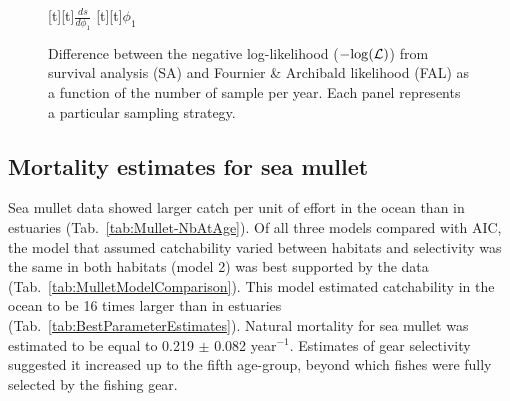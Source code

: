 \documentclass[12pt]{article}
\begin{document}
\begin{figure}
[t][t]{{\protect\large $\displaystyle\frac{ds}{d\phi_1}$}}
[t][t]{{\protect\Large $\phi_1$}}
\centering
{}
\vspace{2cm}
\caption{Difference between the negative log-likelihood ($-{\rm log}(\mathcal{L})$) from survival analysis (SA) and Fournier \& Archibald likelihood (FAL) as a function of the number of sample per year. Each panel represents a particular sampling strategy.}
\label{fig:ComparisonOfNegLL}
\end{figure}


    \subsection{Mortality estimates for sea mullet}

Sea mullet data showed larger catch per unit of effort in the ocean than in estuaries (Tab.~\ref{tab:Mullet-NbAtAge}). Of all three models compared with AIC, the model that assumed catchability varied between habitats and selectivity was the same in both habitats (model 2) was best supported by the data (Tab.~\ref{tab:MulletModelComparison}). This model estimated catchability in the ocean to be 16 times larger than in estuaries (Tab.~\ref{tab:BestParameterEstimates}). Natural mortality for sea mullet was estimated to be equal to 0.219 $\pm$ 0.082 year$^{-1}$. Estimates of gear selectivity suggested it increased up to the fifth age-group, beyond which fishes were fully selected by the fishing gear.\\
\end{document}
